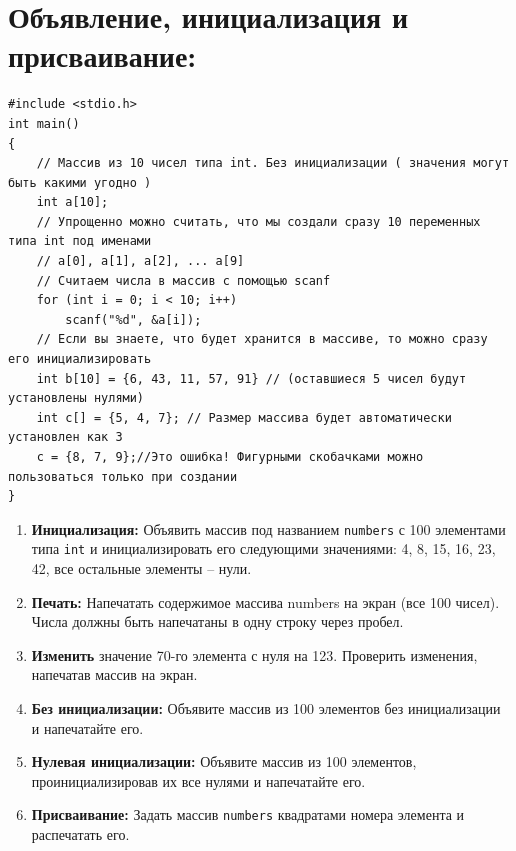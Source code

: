 \documentclass{article}
\begin{document}
\section*{Объявление, инициализация и присваивание:}
\begin{lstlisting}
#include <stdio.h>
int main() 
{
	// Массив из 10 чисел типа int. Без инициализации ( значения могут быть какими угодно )
	int a[10];
	// Упрощенно можно считать, что мы создали сразу 10 переменных типа int под именами
	// a[0], a[1], a[2], ... a[9]
	// Считаем числа в массив с помощью scanf
	for (int i = 0; i < 10; i++)
		scanf("%d", &a[i]);
	// Если вы знаете, что будет хранится в массиве, то можно сразу его инициализировать
	int b[10] = {6, 43, 11, 57, 91} // (оставшиеся 5 чисел будут установлены нулями)
	int c[] = {5, 4, 7}; // Размер массива будет автоматически установлен как 3
	с = {8, 7, 9};//Это ошибка! Фигурными скобачками можно пользоваться только при создании
}
\end{lstlisting}
\begin{enumerate}
\item \textbf{Инициализация:} Объявить массив под названием \texttt{numbers} с 100 элементами типа \texttt{int} и инициализировать его следующими значениями: 4, 8, 15, 16, 23, 42, все остальные элементы -- нули.
\item \textbf{Печать:} Напечатать содержимое массива numbers на экран (все 100 чисел). Числа должны быть напечатаны в одну строку через пробел.
\item \textbf{Изменить} значение 70-го элемента с нуля на 123. Проверить изменения, напечатав массив на экран.
\item \textbf{Без инициализации:} Объявите массив из 100 элементов без инициализации и напечатайте его.
\item \textbf{Нулевая инициализации:} Объявите массив из 100 элементов, проинициализировав их все нулями и напечатайте его.
\item \textbf{Присваивание:} Задать массив \texttt{numbers} квадратами номера элемента и распечатать его.
\end{enumerate}
\end{document}
